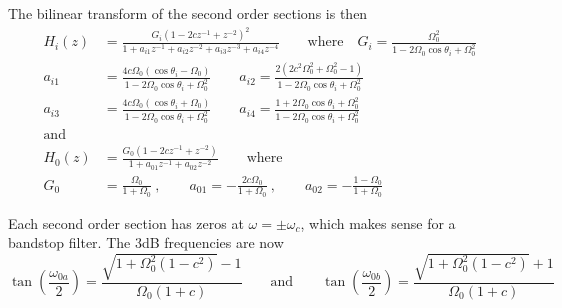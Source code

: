 The bilinear transform of the second order sections is then
\begin{align*}
	H_i(z) &= \frac{G_i(1-2cz^{-1}+z^{-2})^2}{1+a_{i1}z^{-1}+a_{i2}z^{-2}+a_{i3}z^{-3}+a_{i4}z^{-4}}
	\qquad \text{where} \quad
	G_i = \frac{\Omega_0^2}{1-2\Omega_0\cos\theta_i+\Omega_0^2} \\
	a_{i1} &= \frac{4c\Omega_0(\cos\theta_i-\Omega_0)}{1-2\Omega_0\cos\theta_i+\Omega_0^2} \qquad
	a_{i2} = \frac{2(2c^2\Omega_0^2+\Omega_0^2-1)}{1-2\Omega_0\cos\theta_i+\Omega_0^2} \\
	a_{i3} &= \frac{4c\Omega_0(\cos\theta_i+\Omega_0)}{1-2\Omega_0\cos\theta_i+\Omega_0^2} \qquad
	a_{i4} = \frac{1+2\Omega_0\cos\theta_i+\Omega_0^2}{1-2\Omega_0\cos\theta_i+\Omega_0^2} \\
	\text{and} \\
	H_0(z) &= \frac{G_0(1-2cz^{-1}+z^{-2})}{1+a_{01}z^{-1}+a_{02}z^{-2}} \qquad \text{where} \\
	G_0 &= \frac{\Omega_0}{1+\Omega_0}\:,\qquad
	a_{01} = -\frac{2c\Omega_0}{1+\Omega_0} \:,\qquad
	a_{02} = -\frac{1-\Omega_0}{1+\Omega_0}
\end{align*}

Each second order section has zeros at $\omega = \pm \omega_c$,  which makes
sense for a bandstop filter. The 3dB frequencies are now
\begin{equation*}
	\tan\left(\frac{\omega_{0a}}{2}\right) = \frac{\sqrt{1+\Omega_0^2(1-c^2)}-1}{\Omega_0(1+c)}
  \qquad \text{and} \qquad
	\tan\left(\frac{\omega_{0b}}{2}\right) = \frac{\sqrt{1+\Omega_0^2(1-c^2)}+1}{\Omega_0(1+c)}
\end{equation*}
